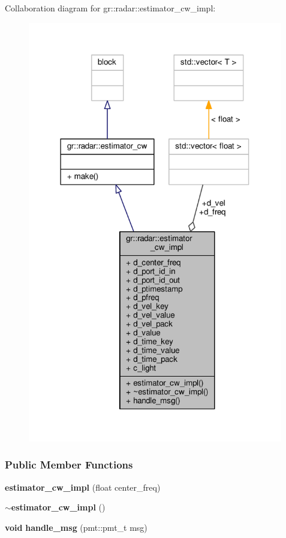Collaboration diagram for gr\+:\+:radar\+:\+:estimator\+\_\+cw\+\_\+impl\+:
\nopagebreak
\begin{figure}[H]
\begin{center}
\leavevmode
\includegraphics[width=316pt]{d4/dcd/classgr_1_1radar_1_1estimator__cw__impl__coll__graph}
\end{center}
\end{figure}
\subsubsection*{Public Member Functions}
\begin{DoxyCompactItemize}
\item 
{\bf estimator\+\_\+cw\+\_\+impl} (float center\+\_\+freq)
\item 
{\bf $\sim$estimator\+\_\+cw\+\_\+impl} ()
\item 
{\bf void} {\bf handle\+\_\+msg} (pmt\+::pmt\+\_\+t msg)
\end{DoxyCompactItemize}
